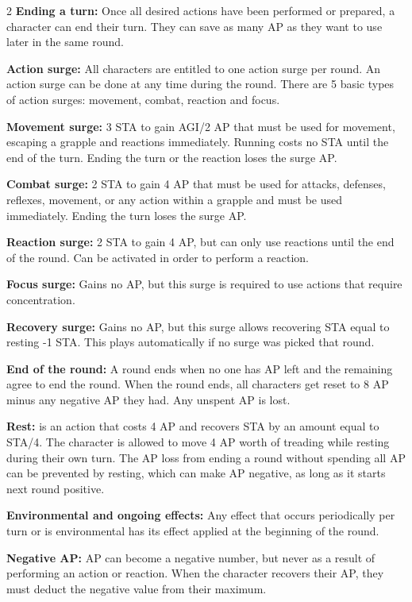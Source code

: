 \begin{multicols}{2}
\textbf{Ending a turn:} Once all desired actions have been performed or prepared, a character can end their turn. They can save as many AP as they want to use later in the same round.

\textbf{Action surge:} All characters are entitled to one action surge per round. An action surge can be done at any time during the round. There are 5 basic types of action surges: movement, combat, reaction and focus.

\begin{proplist}
    \item \textbf{Movement surge:} 3 STA to gain AGI/2 AP that must be used for movement, escaping a grapple and reactions immediately. Running costs no STA until the end of the turn. Ending the turn or the reaction loses the surge AP.
    \item \textbf{Combat surge:} 2 STA to gain 4 AP that must be used for attacks, defenses, reflexes, movement, or any action within a grapple and must be used immediately. Ending the turn loses the surge AP.
    \item \textbf{Reaction surge:} 2 STA to gain 4 AP, but can only use reactions until the end of the round. Can be activated in order to perform a reaction.
    \item \textbf{Focus surge:} Gains no AP, but this surge is required to use actions that require concentration.
    \item \textbf{Recovery surge:} Gains no AP, but this surge allows recovering STA equal to resting -1 STA. This plays automatically if no surge was picked that round.
\end{proplist}

\textbf{End of the round:} A round ends when no one has AP left and the remaining agree to end the round. When the round ends, all characters get reset to 8 AP minus any negative AP they had. Any unspent AP is lost.

\textbf{Rest:} is an action that costs 4 AP and recovers STA by an amount equal to STA/4. The character is allowed to move 4 AP worth of treading while resting during their own turn. The AP loss from ending a round without spending all AP can be prevented by resting, which can make AP negative, as long as it starts next round positive.

\textbf{Environmental and ongoing effects:} Any effect that occurs periodically per turn or is environmental has its effect applied at the beginning of the round.

\textbf{Negative AP:} AP can become a negative number, but never as a result of performing an action or reaction. When the character recovers their AP, they must deduct the negative value from their maximum.



\end{multicols}
